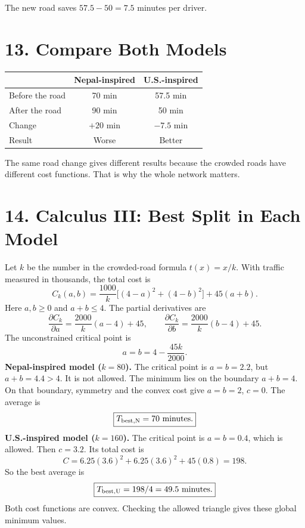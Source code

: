 \documentclass[11pt,a4paper]{article}
\newcommand{\sectiontitle}[1]{\section*{\color{navy}#1}}
\begin{document}
The new road saves $57.5-50=\boxed{7.5}$ minutes per driver.

\sectiontitle{13. Compare Both Models}
\begin{center}\renewcommand{\arraystretch}{1.4}\begin{tabular}{p{5.2cm}cc}\toprule
 & Nepal-inspired & U.S.-inspired\\\midrule
Before the road & 70 min & 57.5 min\\
After the road & 90 min & 50 min\\
Change & $+20$ min & $-7.5$ min\\
Result & Worse & Better\\\bottomrule
\end{tabular}\end{center}
\begin{center}\end{center}
The same road change gives different results because the crowded roads have different cost functions. That is why the whole network matters.

\sectiontitle{14. Calculus III: Best Split in Each Model}
Let $k$ be the number in the crowded-road formula $t(x)=x/k$. With traffic measured in thousands, the total cost is
\[C_k(a,b)=\frac{1000}{k}\big[(4-a)^2+(4-b)^2\big]+45(a+b).\]
Here $a,b\geq0$ and $a+b\leq4$. The partial derivatives are
\[\frac{\partial C_k}{\partial a}=\frac{2000}{k}(a-4)+45,\qquad
\frac{\partial C_k}{\partial b}=\frac{2000}{k}(b-4)+45.\]
The unconstrained critical point is
\[a=b=4-\frac{45k}{2000}.\]
\textbf{Nepal-inspired model ($k=80$).} The critical point is $a=b=2.2$, but $a+b=4.4>4$. It is not allowed. The minimum lies on the boundary $a+b=4$. On that boundary, symmetry and the convex cost give $a=b=2$, $c=0$. The average is
\[\boxed{T_{\rm best,N}=70\text{ minutes}.}\]
\textbf{U.S.-inspired model ($k=160$).} The critical point is $a=b=0.4$, which is allowed. Then $c=3.2$. Its total cost is
\[C=6.25(3.6)^2+6.25(3.6)^2+45(0.8)=198.\]
So the best average is
\[\boxed{T_{\rm best,U}=198/4=49.5\text{ minutes}.}\]
Both cost functions are convex. Checking the allowed triangle gives these global minimum values.
\end{document}
